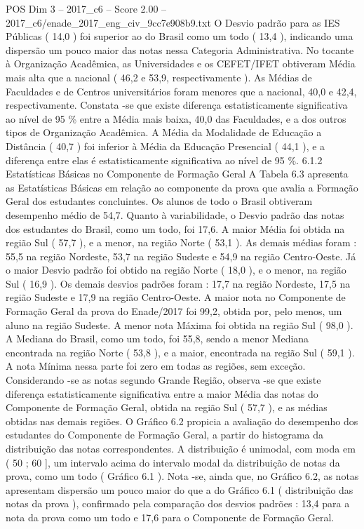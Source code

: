 \begin{textsample}{POS Dim 3 – 2017\_c6 – Score 2.00 – 2017\_c6/enade\_2017\_eng\_civ\_9cc7e908b9.txt}
O Desvio padrão para as IES Públicas ( 14,0 ) foi superior ao do Brasil como um todo ( 13,4 ), indicando uma dispersão um pouco maior das notas nessa Categoria Administrativa.
No tocante à Organização Acadêmica, as Universidades e os CEFET/IFET obtiveram Média mais alta que a nacional ( 46,2 e 53,9, respectivamente ).
As Médias de Faculdades e de Centros universitários foram menores que a nacional, 40,0 e 42,4, respectivamente.
Constata -se que existe diferença estatisticamente significativa ao nível de 95 \% entre a Média mais baixa, 40,0 das Faculdades, e a dos outros tipos de Organização Acadêmica.
A Média da Modalidade de Educação a Distância ( 40,7 ) foi inferior à Média da Educação Presencial ( 44,1 ), e a diferença entre elas é estatisticamente significativa ao nível de 95 \%. 6.1.2 Estatísticas Básicas no Componente de Formação Geral A Tabela 6.3 apresenta as Estatísticas Básicas em relação ao componente da prova que avalia a Formação Geral dos estudantes concluintes.
Os alunos de todo o Brasil obtiveram desempenho médio de 54,7.
Quanto à variabilidade, o Desvio padrão das notas dos estudantes do Brasil, como um todo, foi 17,6.
A maior Média foi obtida na região Sul ( 57,7 ), e a menor, na região Norte ( 53,1 ).
As demais médias foram : 55,5 na região Nordeste, 53,7 na região Sudeste e 54,9 na região Centro-Oeste.
Já o maior Desvio padrão foi obtido na região Norte ( 18,0 ), e o menor, na região Sul ( 16,9 ).
Os demais desvios padrões foram : 17,7 na região Nordeste, 17,5 na região Sudeste e 17,9 na região Centro-Oeste.
A maior nota no Componente de Formação Geral da prova do Enade/2017 foi 99,2, obtida por, pelo menos, um aluno na região Sudeste.
A menor nota Máxima foi obtida na região Sul ( 98,0 ).
A Mediana do Brasil, como um todo, foi 55,8, sendo a menor Mediana encontrada na região Norte ( 53,8 ), e a maior, encontrada na região Sul ( 59,1 ).
A nota Mínima nessa parte foi zero em todas as regiões, sem exceção.
Considerando -se as notas segundo Grande Região, observa -se que existe diferença estatisticamente significativa entre a maior Média das notas do Componente de Formação Geral, obtida na região Sul ( 57,7 ), e as médias obtidas nas demais regiões.
O Gráfico 6.2 propicia a avaliação do desempenho dos estudantes do Componente de Formação Geral, a partir do histograma da distribuição das notas correspondentes.
A distribuição é unimodal, com moda em ( 50 ; 60 ], um intervalo acima do intervalo modal da distribuição de notas da prova, como um todo ( Gráfico 6.1 ).
Nota -se, ainda que, no Gráfico 6.2, as notas apresentam dispersão um pouco maior do que a do Gráfico 6.1 ( distribuição das notas da prova ), confirmado pela comparação dos desvios padrões : 13,4 para a nota da prova como um todo e 17,6 para o Componente de Formação Geral.

\end{textsample}
